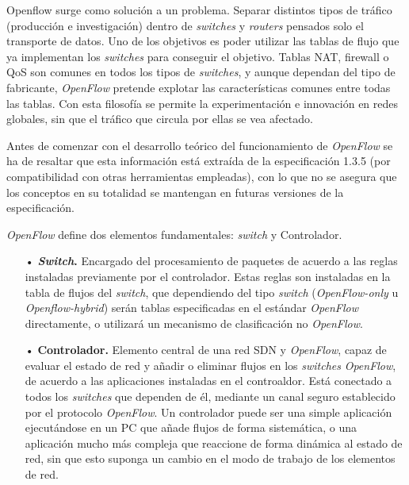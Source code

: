 \documentclass[a4paper,11pt]{book}
\begin{document}
Openflow surge como solución a un problema. Separar distintos tipos de tráfico (producción e investigación) dentro de \textit{switches} y \textit{routers} pensados solo el transporte de datos. Uno de los objetivos es poder utilizar las tablas de flujo que ya implementan los \textit{switches} para conseguir el objetivo. Tablas \ac{NAT}, firewall o \ac{QoS} son comunes en todos los tipos de \textit{switches}, y aunque dependan del tipo de fabricante, \emph{OpenFlow} pretende explotar las características comunes entre todas las tablas. Con esta filosofía se permite la experimentación e innovación en redes globales, sin que el tráfico que circula por ellas se vea afectado.

Antes de comenzar con el desarrollo teórico del funcionamiento de \emph{OpenFlow} se ha de resaltar que esta información está extraída de la especificación 1.3.5 \cite{openflow13} (por compatibilidad con otras herramientas empleadas), con lo que no se asegura que los conceptos en su totalidad se mantengan en futuras versiones de la especificación.

\emph{OpenFlow} define dos elementos fundamentales: \textit{switch} y Controlador. 

\begin{itemize}
\item[•]\textbf{\textit{Switch}.} Encargado del procesamiento de paquetes de acuerdo a las reglas instaladas previamente por el controlador. Estas reglas son instaladas en la tabla de flujos del \textit{switch}, que dependiendo del tipo \textit{switch} (\textit{OpenFlow-only} u \textit{Openflow-hybrid}) serán tablas especificadas en el estándar \emph{OpenFlow} directamente, o utilizará un mecanismo de clasificación no \emph{OpenFlow}. 

\item[•]\textbf{Controlador.} Elemento central de una red \ac{SDN} y \emph{OpenFlow}, capaz de evaluar el estado de red y añadir o eliminar flujos en los \textit{switches} \emph{OpenFlow}, de acuerdo a las aplicaciones instaladas en el controaldor. Está conectado a todos los \textit{switches} que dependen de él, mediante un canal seguro establecido por el protocolo \emph{OpenFlow}. Un controlador puede ser una simple aplicación ejecutándose en un PC que añade flujos de forma sistemática, o una aplicación mucho más compleja que reaccione de forma dinámica al estado de red, sin que esto suponga un cambio en el modo de trabajo de los elementos de red.
\end{itemize}
\end{document}
